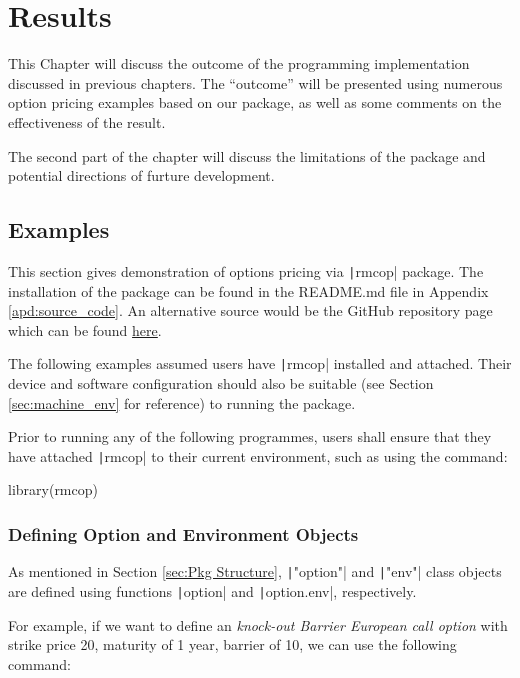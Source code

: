 \chapter{Results} \label{cpt:Results}

This Chapter will discuss the outcome of the programming implementation discussed in previous chapters. The ``outcome'' will be presented using numerous option pricing examples based on our package, as well as some comments on the effectiveness of the result.

The second part of the chapter will discuss the limitations of the package and potential directions of furture development.

\section{Examples} \label{sec:examples}

This section gives demonstration of options pricing via \texttt|rmcop| package. The installation of the package can be found in the README.md file in Appendix \ref{apd:source_code}. An alternative source would be the GitHub repository page which can be found \hyperref{https://github.com/ZhaiJason/rmcop}{site}{rmcop GitHub repository}{here}.

The following examples assumed users have \texttt|rmcop| installed and attached. Their device and software configuration should also be suitable (see Section \ref{sec:machine_env} for reference) to running the package.

Prior to running any of the following programmes, users shall ensure that they have attached \texttt|rmcop| to their current environment, such as using the command:

\begin{Rminted}
library(rmcop)
\end{Rminted}

\subsection{Defining Option and Environment Objects}

As mentioned in Section \ref{sec:Pkg Structure}, \texttt|"option"| and \texttt|"env"| class objects are defined using functions \texttt|option| and \texttt|option.env|, respectively.

For example, if we want to define an \textit{knock-out Barrier European call option} with strike price 20, maturity of 1 year, barrier of 10, we can use the following command:

